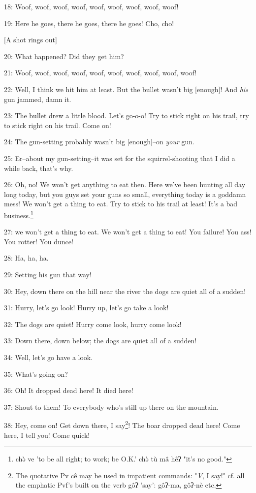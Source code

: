 18: Woof, woof, woof, woof, woof, woof, woof, woof, woof!

19: Here he goes, there he goes, there he goes! Cho, cho!

[A shot rings out]

20: What happened? Did they get him?

21:  Woof, woof, woof, woof, woof, woof, woof, woof, woof, woof!

22: Well, I think we hit him at least. But the bullet wasn't big [enough]! And
\textit{his} gun jammed, damn it.

23: The bullet drew a little blood. Let's go-o-o! Try to stick right on his trail,
try to stick right on his trail. Come on!

24: The gun-setting probably wasn't big [enough]--on \textit{your} gun.

25: Er--about my gun-setting--it was set for the squirrel-shooting that I did a
while back, that's why.

26: Oh, no! We won't get anything to eat then. Here we've been hunting all day
long today, but you guys set your guns so small, everything today is a goddamn
mess! We won't get a thing to eat. Try to stick to his trail at least! It's a bad
business.\footnote{chə̀ ve 'to be all right; to work; be O.K.' chə̀ tù mâ hêʔ "it's no good."}

27: we won't get a thing to eat. We won't get a thing to eat! You failure! You
ass! You rotter! You dunce!

28: Ha, ha, ha.

29: Setting his gun that way!

30: Hey, down there on the hill near the river the dogs are quiet all of a sudden!

31: Hurry, let's go look! Hurry up, let's go take a look!

32: The dogs are quiet! Hurry come look, hurry come look!

33: Down there, down below; the dogs are quiet all of a sudden!

34: Well, let's go have a look.

35: What's going on?

36: Oh! It dropped dead here! It died here!

37: Shout to them! To everybody who's still up there on the mountain.

38: Hey, come on! Get down there, I say\footnote{The quotative Pv cê may be used in impatient commands: "\emph{V}, I say!" cf. all the emphatic Pvf's built on the verb gôʔ 'say': gôʔ-ma, gôʔ-nè etc.}! The boar dropped dead here! Come here,
I tell you! Come quick!

